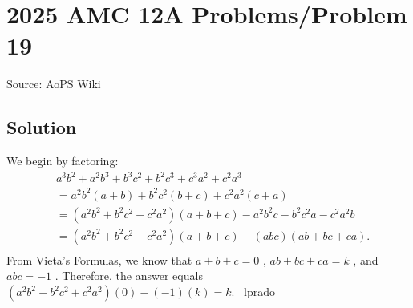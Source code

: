 \documentclass[12pt]{article}
\begin{document}
\section*{{2025 AMC 12A Problems/Problem 19}}
Source: AoPS Wiki

\subsection*{Solution}
We begin by factoring:
\begin{equation}
\begin{split}
&a^3b^2+a^2b^3+b^3c^2+b^2c^3+c^3a^2+c^2a^3 \\
&=a^2b^2(a+b)+b^2c^2(b+c)+c^2a^2(c+a)\\
&=(a^2b^2+b^2c^2+c^2a^2)(a+b+c) - a^2b^2c-b^2c^2a-c^2a^2b\\
&=(a^2b^2+b^2c^2+c^2a^2)(a+b+c) - (abc)(ab+bc+ca).\\
\end{split}
\end{equation}
From Vieta's Formulas, we know that $a+b+c = 0$ , $ab+bc+ca = k$ , and $abc = -1$ . Therefore, the answer equals $(a^2b^2+b^2c^2+c^2a^2)(0) - (-1)(k) = \boxed{k}.$ ~lprado
\end{document}
